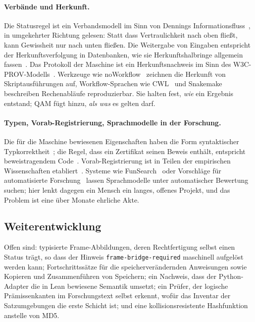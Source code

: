 \paragraph{Verbände und Herkunft.} Die Statusregel ist ein Verbandsmodell im Sinn von Dennings Informationsfluss~\cite{denning}, in umgekehrter
Richtung gelesen: Statt dass Vertraulichkeit nach oben fließt, kann Gewissheit nur nach unten fließen. Die Weitergabe von Eingaben entspricht
der Herkunftsverfolgung in Datenbanken, wie sie Herkunftshalbringe allgemein fassen~\cite{semiring}. Das Protokoll der Maschine ist ein
Herkunftsnachweis im Sinn des W3C-PROV-Modells~\cite{prov}. Werkzeuge wie noWorkflow~\cite{noworkflow} zeichnen die Herkunft von
Skriptausführungen auf, Workflow-Sprachen wie CWL~\cite{cwl} und Snakemake~\cite{snakemake} beschreiben Rechenabläufe reproduzierbar. Sie
halten fest, \emph{wie} ein Ergebnis entstand; QAM fügt hinzu, \emph{als was} es gelten darf.

\paragraph{Typen, Vorab-Registrierung, Sprachmodelle in der Forschung.} Die für die Maschine bewiesenen Eigenschaften haben die Form
syntaktischer Typkorrektheit~\cite{wright,pierce}; die Regel, dass ein Zertifikat seinen Beweis enthält, entspricht beweistragendem
Code~\cite{necula}. Vorab-Registrierung ist in Teilen der empirischen Wissenschaften etabliert~\cite{nosek}. Systeme wie
FunSearch~\cite{funsearch} oder Vorschläge für automatisierte Forschung~\cite{aiscientist} lassen Sprachmodelle unter automatischer
Bewertung suchen; hier lenkt dagegen ein Mensch ein langes, offenes Projekt, und das Problem ist eine über Monate ehrliche Akte.

\subsection{Weiterentwicklung}

Offen sind: typisierte Frame-Abbildungen, deren Rechtfertigung selbst einen Status trägt, so dass der Hinweis
\texttt{frame-bridge-required} maschinell aufgelöst werden kann; Fortschrittssätze für die speicherverändernden Anweisungen sowie Kopieren
und Zusammenführen von Speichern; ein Nachweis, dass der Python-Adapter die in Lean bewiesene Semantik umsetzt; ein Prüfer, der logische
Prämissenkanten im Forschungstext selbst erkennt, wofür das Inventar der Satzumgebungen die erste Schicht ist; und eine
kollisionsresistente Hashfunktion anstelle von MD5.

